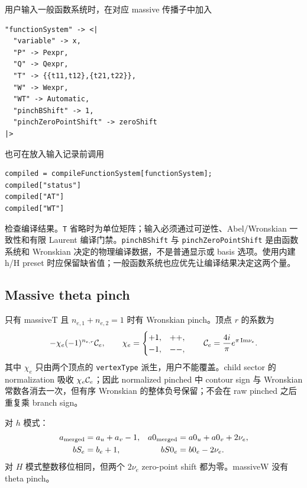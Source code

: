 ﻿\documentclass[a4paper,11pt]{article}
\begin{document}
用户输入一般函数系统时，在对应 massive 传播子中加入
\begin{verbatim}
"functionSystem" -> <|
  "variable" -> x,
  "P" -> Pexpr,
  "Q" -> Qexpr,
  "T" -> {{t11,t12},{t21,t22}},
  "W" -> Wexpr,
  "WT" -> Automatic,
  "pinchBShift" -> 1,
  "pinchZeroPointShift" -> zeroShift
|>
\end{verbatim}
也可在放入输入记录前调用
\begin{verbatim}
compiled = compileFunctionSystem[functionSystem];
compiled["status"]
compiled["AT"]
compiled["WT"]
\end{verbatim}
检查编译结果。\texttt{T} 省略时为单位矩阵；输入必须通过可逆性、Abel/Wronskian 一致性和有限 Laurent 编译门禁。\texttt{pinchBShift} 与 \texttt{pinchZeroPointShift} 是由函数系统和 Wronskian 决定的物理编译数据，不是普通显示或 basis 选项。使用内建 h/H preset 时应保留缺省值；一般函数系统也应优先让编译结果决定这两个量。

\subsection{Massive theta pinch}

只有 massiveT 且 $n_{e,1}+n_{e,2}=1$ 时有 Wronskian pinch。顶点 $r$ 的系数为
\begin{equation}
  -\chi_e(-1)^{n_{e,r}}{\cal C}_e,
  \qquad
  \chi_e=
  \begin{cases}
  +1,&++,\\
  -1,&--,
  \end{cases}
 \qquad
 {\cal C}_e=\frac{4i}{\pi}e^{\pi\,\mathrm{Im}\nu_e}.
 \label{massivePinchSign}
\end{equation}
其中 $\chi_e$ 只由两个顶点的 \texttt{vertexType} 派生，用户不能覆盖。child sector 的
normalization 吸收 $\chi_e{\cal C}_e$；因此 normalized pinched 中 contour sign 与
Wronskian 常数各消去一次，但有序 Wronskian 的整体负号保留；不会在 raw pinched 之后重复乘 branch sign。

对 $h$ 模式：
\begin{align}
 a_{\rm merged}&=a_u+a_v-1,&
 a0_{\rm merged}&=a0_u+a0_v+2\nu_e,\\
 bS_e&=b_e+1,&
 bS0_e&=b0_e-2\nu_e.
\end{align}
对 $H$ 模式整数移位相同，但两个 $2\nu_e$ zero-point shift 都为零。massiveW 没有 theta pinch。
\end{document}
